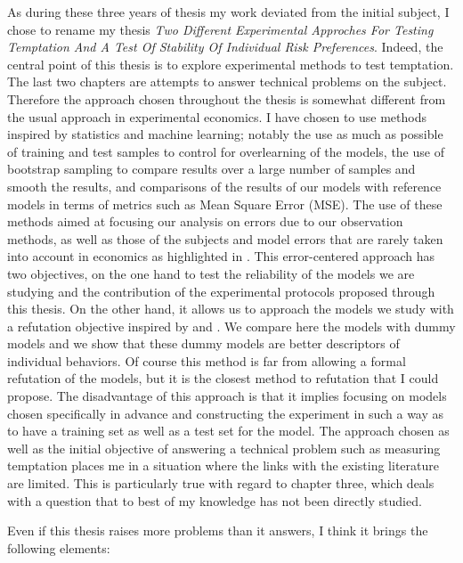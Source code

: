 \documentclass[
]{book}
\begin{document}
As during these three years of thesis my work deviated from the initial subject,
I chose to rename my thesis \emph{Two Different Experimental Approches For Testing
Temptation And A Test Of Stability Of Individual Risk Preferences}.
Indeed, the central point of this thesis is to explore experimental methods to
test temptation.
The last two chapters are attempts to answer technical problems on the subject.
Therefore the approach chosen throughout the thesis is somewhat different from
the usual approach in experimental economics.
I have chosen to use methods inspired by statistics and machine learning;
notably the use as much as possible of training and test samples to control for
overlearning of the models, the use of bootstrap sampling to compare results
over a large number of samples and smooth the results, and comparisons of the
results of our models with reference models in terms of metrics such as Mean
Square Error (MSE).
The use of these methods aimed at focusing our analysis on errors due to our
observation methods, as well as those of the subjects and model errors that are
rarely taken into account in economics as highlighted in \citet{taleb2005fooled}.
This error-centered approach has two objectives, on the one hand to test the
reliability of the models we are studying and the contribution of the
experimental protocols proposed through this thesis.
On the other hand, it allows us to approach the models we study with a
refutation objective inspired by \citet{popper2005logic} and \citet{popper2014conjectures}.
We compare here the models with dummy models and we show that these dummy models
are better descriptors of individual behaviors.
Of course this method is far from allowing a formal refutation of the models, but it is the
closest method to refutation that I could propose.
The disadvantage of this approach is that it implies focusing on models chosen
specifically in advance and constructing the experiment in such a way as to have
a training set as well as a test set for the model.
The approach chosen as well as the initial objective of answering a technical
problem such as measuring temptation places me in a situation where the links
with the existing literature are limited. This is particularly true with regard to chapter
three, which deals with a question that to best of my knowledge has not been directly studied.

Even if this thesis raises more problems than it answers, I think it brings the
following elements:
\end{document}
